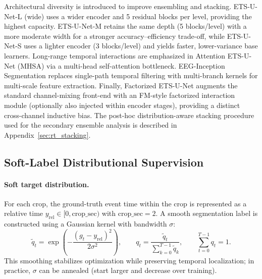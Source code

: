 \documentclass[12pt]{article}
\begin{document}
Architectural diversity is introduced to improve ensembling and stacking. ETS-U-Net-L (wide) uses a wider encoder and
5 residual blocks per level, providing the highest capacity. ETS-U-Net-M retains the same depth (5 blocks/level) with a
more moderate width for a stronger accuracy--efficiency trade-off, while ETS-U-Net-S uses a lighter encoder
(3 blocks/level) and yields faster, lower-variance base learners. Long-range temporal interactions are emphasized in
Attention ETS-U-Net (MHSA) via a multi-head self-attention bottleneck. EEG-Inception Segmentation replaces single-path temporal filtering
with multi-branch kernels for multi-scale feature extraction. Finally, Factorized ETS-U-Net augments the standard channel-mixing
front-end with an FM-style factorized interaction module (optionally also injected within encoder stages), providing a
distinct cross-channel inductive bias. The post-hoc distribution-aware stacking procedure used for the secondary ensemble analysis is described in Appendix~\ref{sec:rt_stacking}.

\subsection{Soft-Label Distributional Supervision}

\paragraph{Soft target distribution.}
For each crop, the ground-truth event time within the crop is represented as a relative time
$y_{\mathrm{rel}}\in[0,\mathrm{crop\_sec})$ with $\mathrm{crop\_sec}=2$.
A smooth segmentation label is constructed using a Gaussian kernel with bandwidth $\sigma$:
\begin{equation}
\label{eq:rt_soft_target}
\tilde q_t=\exp\left(-\frac{(g_t-y_{\mathrm{rel}})^2}{2\sigma^2}\right),\qquad
q_t=\frac{\tilde q_t}{\sum_{k=0}^{T-1}\tilde q_k},\qquad
\sum_{t=0}^{T-1} q_t=1.
\end{equation}
This smoothing stabilizes optimization while preserving temporal localization; in practice, $\sigma$ can be annealed
(start larger and decrease over training).
\end{document}
